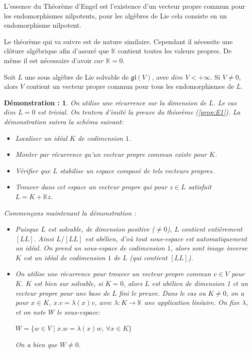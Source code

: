 \documentclass[a4paper,openany,12pt]{report}
\newcommand{\KK}{\mathbb{K}}
\newcommand{\gl}{\mathfrak{gl}}
\theoremstyle{break}
{\theorembodyfont{\upshape}
\newtheorem*{rmq}{Remarque :}
\newtheorem*{prv}{Preuve :}
\newtheorem*{ex}{Exemples :}
\newtheorem{exe}{Exemple : }
\newtheorem*{nota}{Notation :}}
\newtheorem*{dem}{D\'emonstration :}
\begin{document}
\quad L'essence du Théorème d'Engel est l’existence d'un vecteur propre commun pour les endomorphismes nilpotents, pour les algèbres de Lie cela consiste en un endomorphisme nilpotent.

\quad Le théorème qui va suivre est de nature similaire. Cependant il nécessite une clôture algébrique afin d'assuré que $\KK$ contient toutes les valeurs propres. De même il est nécessaire d'avoir $car$ $\KK =0$.

\begin{thm}\label{thm:L1}
\quad Soit $L$ une sous algèbre de Lie solvable de $\gl(V)$, avec $dim$ $V < +\infty$. Si $V \neq 0$, alors $V$ contient un vecteur propre commun pour tous les endomorphismes de $L$.
\end{thm}

\begin{dem}
\quad On utilise une récurrence sur la dimension de $L$. 
Le cas $dim$ $L=0$ est trivial. 
On tentera d'imité la preuve du théorème (\ref{prop:E1}). La démonstration suivra la schéma suivant:
\begin{itemize}
\item[(1)] Localiser un idéal $K$ de codimension $1$.
\item[(2)] Monter par récurrence qu'un vecteur propre commun existe pour $K$.
\item[(3)] Vérifier que $L$ stabilise un espace composé de tels vecteurs propres.
\item[(4)] Trouver dans cet espace un vecteur propre qui pour $z \in L$ satisfait $L=K+\KK z$.
\end{itemize}
Commençons maintenant la démonstration :
\begin{itemize}
\item[(1)] Puisque $L$ est solvable, de dimension positive ($\neq  0$), $L$ contient entièrement $[LL]$. Ainsi $L/[LL]$ est abélien, d'où tout sous-espace est automatiquement un idéal. On prend un sous-espace de codimension $1$, alors sont image inverse $K$ est un idéal de codimension $1$ de $L$ (qui contient $[LL]$).

\item[(2)] On utilise une récurrence pour trouver un vecteur propre commun $v \in V$ pour $K$. $K$ est bien sur solvable, si $K=0$, alors $L$ est abélien de dimension 1 et un vecteur propre pour une base de $L$ fini le preuve. Dans le cas ou $K \neq 0$, on a pour $x \in K$, $x.v= \lambda(x)v$, avec $\lambda : K \to \KK$ une application linéaire. On fixe $\lambda$, et on note $W$ le sous-espace:
\begin{center}
$W=\{ w \in V \mid x.w= \lambda(x)w$, $\forall x \in K \} $
\end{center}
On a bien que $W \neq 0$.


\end{itemize}
\end{dem}
\end{document}
